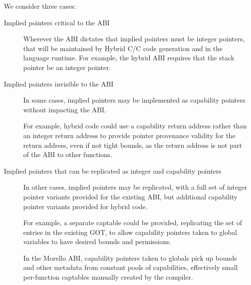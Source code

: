 \documentclass[12pt,twoside,openright,a4paper]{article}
\newcommand{\ccode}[1]{{\small\ttfamily{#1}}}
\newcommand{\cfunc}[1]{{\ccode{#1()}}}
\newcommand{\futurevariant}[1]{{\color{blue} #1}}
\newcommand{\morellovariant}[1]{{\color{red} #1}}
\newcommand{\note}[2]{{\color{blue}[ Note: #1 - #2]}}
\renewcommand{\note}[2]{\relax\ifhmode\unskip\fi}
\newcommand{\rwnote}[1]{\note{#1}{Robert W.}}
\newcommand{\jrtcnote}[1]{\note{#1}{Jess C.}}
\newcommand*{\cpp}{\texorpdfstring{C\textsmaller[2]{\protect\nolinebreak[4]\hspace{-.05em}\raisebox{.45ex}{\textbf{++}}}}{C++}}
\newcommand*{\COrCpp}{C/\cpp{}}
\newcommand*{\hybridCOrCpp}{Hybrid \COrCpp{}}
\begin{document}
We consider three cases:

\begin{description}
\item[Implied pointers critical to the ABI]
  Wherever the ABI dictates that implied pointers must be integer pointers,
  that will be maintained by \hybridCOrCpp{} code generation and in the
  language runtime.
  For example, the hybrid ABI requires that the stack pointer be an integer
  pointer.

\item[Implied pointers invisible to the ABI]
  In some cases, implied pointers may be implemented as capability pointers
  without impacting the ABI.

  {\color{blue} For example, hybrid code could use a capability return address
  rather than an integer return address to provide pointer provenance validity
  for the return address, even if not tight bounds, as the return address is
  not part of the ABI to other functions.}
  \jrtcnote{\cfunc{\_\_builtin\_return\_address} does leak these implied
  pointers to some code, and it has implications for things like libunwind, so
  it does affect the ABI. Also the kernel needs to know to put a capability in
  CRA in order for signal handlers to be able to return to \cfunc{sigcode}.
  There's a lot of subtlety here that needs to be captured.}
  \rwnote{I'd been pondering whether the ABI might allow us to use a return
  capability, but in which unwind/etc only looked at the lower 64 bits...  And
  I suppose the builtin could be polymorphic.  But signals are indeed a messy
  issue.
  Is there a better example we could give?}

\item[Implied pointers that can be replicated as integer and capability
  pointers]
  In other cases, implied pointers may be replicated, with a full set of
  integer pointer variants provided for the existing ABI, but additional
  capability pointer variants provided for hybrid code.

  \futurevariant{For example, a separate captable could be provided,
  replicating the set of entries in the existing GOT, to allow capability
  pointers taken to global variables to have desired bounds and permissions.}

  \morellovariant{In the Morello ABI, capability pointers taken to globals
  pick up bounds and other metadata from constant pools of capabilities,
  effectively small per-function captables manually created by the compiler.}
\end{description}
\end{document}
